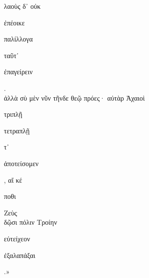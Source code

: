 \documentclass{ransom}
\begin{document}
\begin{foreignpage}
\begin{graytext}
λαοὺς δ᾽ οὐκ \begin{whitetext}ἐπέοικε\end{whitetext} \begin{whitetext}παλίλλογα\end{whitetext} ταῦτ᾽ \begin{whitetext}ἐπαγείρειν\end{whitetext}.\\
ἀλλὰ σὺ μὲν νῦν τῆνδε θεῷ πρόες· αὐτὰρ Ἀχαιοὶ\\
\begin{whitetext}τριπλῇ\end{whitetext} \begin{whitetext}τετραπλῇ\end{whitetext} τ᾽ \begin{whitetext}ἀποτείσομεν\end{whitetext}, αἴ κέ \begin{whitetext}ποθι\end{whitetext} Ζεὺς\\
δῷσι πόλιν Τροίην \begin{whitetext}εὐτείχεον\end{whitetext} \begin{whitetext}ἐξαλαπάξαι\end{whitetext}.»\\

\end{graytext}


\end{foreignpage}
\end{document}
